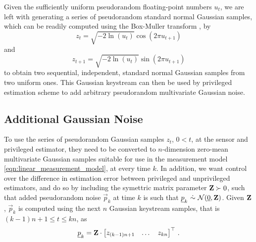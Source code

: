 \documentclass[letterpaper, 10 pt, conference]{IEEEtran}
\theoremstyle{definition}
\theoremstyle{definition}
\theoremstyle{remark}
\begin{document}
Given the sufficiently uniform pseudorandom floating-point numbers $u_t$, we are left with generating a series of pseudorandom standard normal Gaussian samples, which can be readily computed using the Box-Muller transform \cite{paleyFourierTransformsComplex1934}, by
\begin{equation}
   z_t = \sqrt{-2\ln (u_t)}\cos(2\pi u_{t+1})
\end{equation}
and
\begin{equation}
   z_{t+1} = \sqrt{-2\ln (u_t)}\sin(2\pi u_{t+1})
\end{equation}
to obtain two sequential, independent, standard normal Gaussian samples from two uniform ones. This Gaussian keystream can then be used by privileged estimation scheme to add arbitrary pseudorandom multivariate Gaussian noise.

% 
% 

\subsection{Additional Gaussian Noise}\label{subsec:adding_privilege_noise}
To use the series of pseudorandom Gaussian samples $z_t$, $0<t$, at the sensor and privileged estimator, they need to be converted to $n$-dimension zero-mean multivariate Gaussian samples suitable for use in the measurement model \eqref{eqn:linear_measurement_model}, at every time $k$. In addition, we want control over the difference in estimation error between privileged and unprivileged estimators, and do so by including the symettric matrix parameter ${{\mathbf{Z}}}\succ 0$, such that added pseudorandom noise $\vec{p}_k$ at time $k$ is such that $\vec{p}_k\ \dot{\sim}\ \mathcal{N}(\vec{0},\mat{Z})$. Given ${{\mathbf{Z}}}$, $\vec{p}_k$ is computed using the next $n$ Gaussian keystream samples, that is $(k-1)n+1\leq t\leq kn$, as
\begin{equation}
   {\underline{p}}_k = {{\mathbf{Z}}}\cdot
   \begin{bmatrix}
      z_{(k-1)n+1} & \dots & z_{kn}
   \end{bmatrix}^\top\,.
\end{equation}
\end{document}
